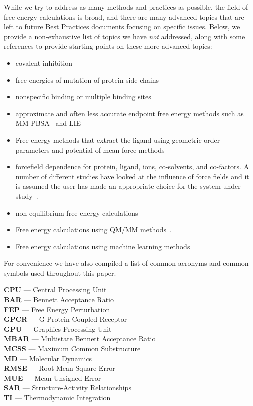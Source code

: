 \documentclass[9pt,bestpractices]{livecoms}
\begin{document}
While we try to address as many methods and practices as possible, the field of free energy calculations is broad, and there are many advanced topics that are left to future Best Practices documents focusing on specific issues. 
Below, we provide a non-exhaustive list of topics we have \emph{not} addressed, along with some references to provide starting points on these more advanced topics:
\begin{itemize}
\item covalent inhibition~\cite{lameira2019predicting}
\item free energies of mutation of protein side chains~\cite{gapsys2016accurate,aldeghi2018accurate}
\item nonspecific binding or multiple binding sites~\cite{gill2018binding}
\item approximate and often less accurate endpoint free energy methods such as MM-PBSA~\cite{genheden2015mm} and LIE~\cite{gutierrez-de-teran2012linear}
\item Free energy methods that extract the ligand using geometric order parameters and potential of mean force methods~\cite{heinzelmann2017attachpullrelease}
\item forcefield dependence for protein, ligand, ions, co-solvents, and co-factors. A number of different studies have looked at the influence of force fields and it is assumed the user has made an appropriate choice for the system under study~\cite{loeffler2018reproducibility, vassetti2019assessment, lopes2015current}. 
\item non-equilibrium free energy calculations~\cite{gapsys2020large}
\item Free energy calculations using QM/MM methods~\cite{beierlein2011simple,dybeck2016comparison,cave-ayland2015direct}.
\item Free energy calculations using machine learning methods~\cite{rufa2020chemical, scheen2020hybrid, cole2020machine}
\end{itemize}

For convenience we have also compiled a list of common acronyms and common symbols used throughout this paper.
\begin{tcolorbox}[title=Acronyms, colback=blue!10!white]
    {\bf CPU} --- Central Processing Unit\\
     {\bf BAR} --- Bennett Acceptance Ratio\\
     {\bf FEP} --- Free Energy Perturbation\\
     {\bf GPCR} --- G-Protein Coupled Receptor\\
     {\bf GPU} --- Graphics Processing Unit\\
     {\bf MBAR} --- Multistate Bennett Acceptance Ratio\\
     {\bf MCSS} --- Maximum Common Substructure\\
     {\bf MD} --- Molecular Dynamics\\
     {\bf RMSE} --- Root Mean Square Error\\
     {\bf MUE} --- Mean Unsigned Error\\
     {\bf SAR} --- Structure-Activity Relationships\\
     {\bf TI} --- Thermodynamic Integration
\end{tcolorbox}
\end{document}
